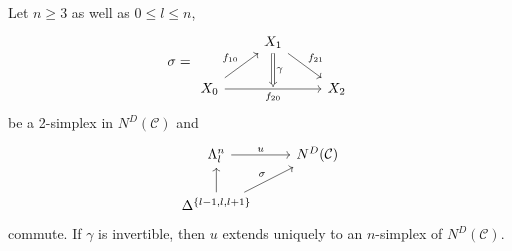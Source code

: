 \begin{prop}
	Let $ n \geq 3 $ as well as $ 0 \leq l \leq n $, 
	\[
	\sigma
	=
	\begin{tikzcd}	
		&
		X_1
		\ar[rd, "f_{21}"]
		\ar[d, Rightarrow, "\gamma"] 
		&
		\\
		X_0
		\ar[ru, "f_{10}" ]
		\ar[rr, "f_{20}"' ]
		&
		{}
		&
		X_2
	\end{tikzcd}
	\]
	be a 2-simplex in $ N^D ( \mathcal{ C } ) $ and 
	\[
	\begin{tikzcd}
		\Lambda_l^n 
		\ar[r, "u"]
		&
		N^D ( \mathcal{ C } )
		\\
		\Delta^{ \{ l - 1 , l , l + 1 \} }
		\ar[ru, " \sigma "]
		\ar[u]
	\end{tikzcd}
	\]
	commute.
	If $ \gamma $ is invertible, then $ u $ extends uniquely to an $ n $-simplex of $ N^D ( \mathcal{ C } ) $.
 \end{prop}

